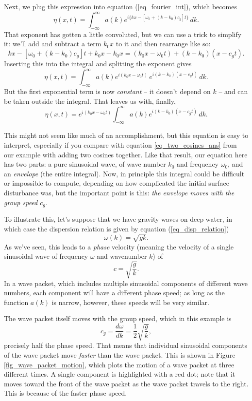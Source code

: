 Next, we plug this expression into equation (\ref{eq_fourier_int}), which becomes
\[
\eta (x, t) = \int_{-\infty}^\infty a(k) e^{i\big\{ kx - [\omega_0 + (k - k_0) c_g ] t \big\}} \, dk.
\]
That exponent has gotten a little convoluted, but we can use a trick to simplify it: we'll add and subtract a term $k_0 x$ to it and then rearrange like so:
\[
kx - [\omega_0 + (k - k_0) c_g ] t + k_0 x - k_0 x = (k_0 x - \omega_0 t) + (k - k_0)(x - c_g t).
\]
Inserting this into the integral and splitting the exponent gives
\[
\eta (x, t) = \int_{-\infty}^\infty a(k) e^{i(k_0 x - \omega_0 t)} \, e^{i(k - k_0) (x - c_g t)} \, dk.
\]
But the first exponential term is now \emph{constant} -- it doesn't depend on $k$ -- and can be taken outside the integral.  That leaves us with, finally,
\begin{equation}
\eta (x, t) =  e^{i(k_0 x - \omega_0 t)} \int_{-\infty}^\infty a(k) e^{i(k - k_0) (x - c_g t)} \, dk.
\end{equation}

This might not seem like much of an accomplishment, but this equation is easy to interpret, especially if you compare with equation \ref{eq_two_cosines_ans} from our example with adding two cosines together.  Like that result, our equation here has two parts:  a pure sinusoidal wave, of wave number $k_0$ and frequency $\omega_0$, and an \emph{envelope} (the entire integral).  Now, in principle this integral could be difficult or impossible to compute, depending on how complicated the initial surface disturbance was, but the important point is this: \emph{the envelope moves with the group speed $c_g$.}

\begin{example}
To illustrate this, let's suppose that we have gravity waves on deep water, in which case the dispersion relation is given by equation (\ref{eq_disp_relation})
\[
\omega(k) = \sqrt{gk}.
\]
As we've seen, this leads to a \emph{phase} velocity (meaning the velocity of a single sinusoidal wave of frequency $\omega$ and wavenumber $k$) of
\[
c = \sqrt{\frac{g}{k}}.
\]
In a wave packet, which includes multiple sinusoidal components of different wave numbers, each component will have a different phase speed; as long as the function $a(k)$ is narrow, however, these speeds will be very similar.

The wave packet itself moves with the group speed, which in this example is
\[
c_g = \frac{d\omega}{dk} = \frac{1}{2} \sqrt{\frac{g}{k} },
\]
precisely half the phase speed.  That means that individual sinusoidal components of the wave packet move \emph{faster} than the wave packet.  This is shown in Figure \ref{fig_wave_packet_motion}, which plots the motion of a wave packet at three different times.  A single component is highlighted with a red dot; note that it moves toward the front of the wave packet as the wave packet travels to the right.  This is because of the faster phase speed.
\end{example}

